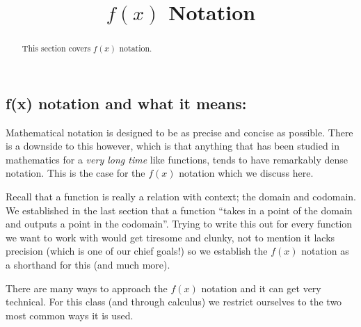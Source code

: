 \documentclass{ximera}
\title{$f(x)$ Notation}
\begin{document}
\begin{abstract}
    This section covers $f(x)$ notation.
\end{abstract}
\maketitle


\subsection*{\textbf{f(x) notation and what it means:}}

    Mathematical notation is designed to be as precise and concise as possible. There is a downside to this however, which is that anything that has been studied in mathematics for a \textit{very long time} like functions, tends to have remarkably dense notation. This is the case for the $f(x)$ notation which we discuss here.
    
    Recall that a function is really a relation with context; the domain and codomain. We established in the last section that a function ``takes in a point of the domain and outputs a point in the codomain''. Trying to write this out for every function we want to work with would get tiresome and clunky, not to mention it lacks precision (which is one of our chief goals!) so we establish the $f(x)$ notation as a shorthand for this (and much more).
    
    There are many ways to approach the $f(x)$ notation and it can get very technical. For this class (and through calculus) we restrict ourselves to the two most common ways it is used.
    
\end{document}
